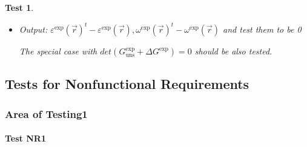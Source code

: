 \documentclass[12pt, titlepage]{article}
\newtheorem{Test}{Test}
\begin{document}
\begin{Test}
\begin{itemize}
	\begin{itemize}
	\item  $\forall \vec{r} \in \mathbb{I}, \ \varepsilon^{\text{exp}}(\vec{r}) = \begin{bmatrix}
	\varepsilon_{\mathit{xx}^{\text{exp}}}(\vec{r}) & \varepsilon_{\mathit{xy}^{\text{exp}}}(\vec{r}) \\
	\varepsilon_{\mathit{xy}^{\text{exp}}}(\vec{r}) & \varepsilon_{\mathit{yy^{\text{exp}}}}(\vec{r})
	\end{bmatrix} = \begin{bmatrix}
	\frac{d-2b}{ad-bc}-1 & \frac{3d-4b-c+2a}{ad-bc} \\
	\frac{3d-4b-c+2a}{ad-bc} & \frac{4a-3c}{ad-bc}-1
	\end{bmatrix} $
	\item $\forall \vec{r} \in \mathbb{I}, \  \omega^{\text{exp}}(\vec{r}) = \begin{bmatrix}
	0 & \omega_{\mathit{xy}^{\text{exp}}}(\vec{r}) \\
	-\omega_{\mathit{xy}^{\text{exp}}}(\vec{r}) & 0 
	\end{bmatrix} = \begin{bmatrix}
	0 & \frac{3d-4b+c-2a}{ad-bc} \\
	-\frac{3d-4b+c-2a}{ad-bc} & 0 
	\end{bmatrix} $
	\end{itemize}

\item Output:  ${\varepsilon^{\text{exp}}(\vec{r})}^{t}-\varepsilon^{\text{exp}}(\vec{r}), {\omega^{\text{exp}}(\vec{r})}^{t}- \omega^{\text{exp}}(\vec{r})$  and test them to be 0

The special case with $det(G_{\text{uns}}^{\text{exp}}+\Delta G^{\text{exp}})=0$ should be also tested.

\end{itemize}
\end{Test}					


\subsection{Tests for Nonfunctional Requirements}

\subsubsection{Area of Testing1}
		
\paragraph{Test NR1}						
\end{document}
